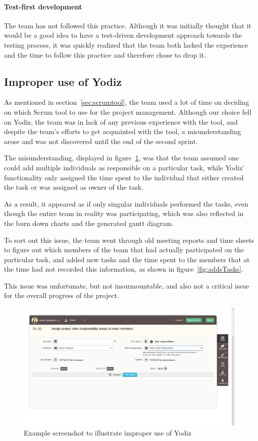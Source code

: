 \paragraph{Test-first development}
The team has not followed this practice. Although it was initially thought that it would be a good idea to have a test-driven development approach towards the testing process, it was quickly realized that the team both lacked the experience and the time to follow this practice and therefore chose to drop it.


\subsection{Improper use of Yodiz}
\label{sec:improperScrum}
As mentioned in section~\ref{sec:scrumtool}, the team used a lot of time on
deciding on which Scrum tool to use for the project management. Although our
choice fell on Yodiz, the team was in lack of any previous experience with the
tool, and despite the team's efforts to get acquainted with the tool, a
misunderstanding arose and was not discovered until the end of the second
sprint.

The misunderstanding, displayed in figure~\ref{fig:wrongUse}, was that the team
assumed one could add multiple individuals as responsible on a particular task,
while Yodiz' functionality only assigned the time spent to the individual that
either created the task or was assigned as owner of the task.

As a result, it appeared as if only singular individuals performed the tasks,
even though the entire team in reality was participating, which was also
reflected in the burn down charts and the generated gantt diagram. 

To sort out this issue, the team went through old meeting reports and time sheets
to figure out which members of the team that had actually participated on the
particular task, and added new tasks and the time spent to the members that at
the time had not recorded this information, as shown in
figure~\ref{fig:addsTasks}.

This issue was unfortunate, but not insurmountable, and also not a critical
issue for the overall progress of the project.

\begin{figure}[H]
\includegraphics[width=\textwidth]{ch/devProcess/fig/wrongUse.png}
\caption{Example screenshot to illustrate improper use of Yodiz}
\label{fig:wrongUse}
\end{figure}

